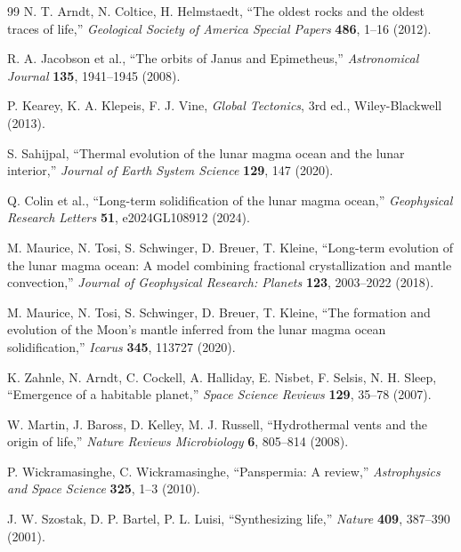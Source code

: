 \documentclass[11pt,a4paper]{article}
\begin{document}
\begin{thebibliography}{99}
		N. T. Arndt, N. Coltice, H. Helmstaedt, ``The oldest rocks and the oldest traces of life,''
		\emph{Geological Society of America Special Papers} \textbf{486}, 1–16 (2012).
		
		R. A. Jacobson et al., ``The orbits of Janus and Epimetheus,''
		\emph{Astronomical Journal} \textbf{135}, 1941–1945 (2008).
		
		P. Kearey, K. A. Klepeis, F. J. Vine, \emph{Global Tectonics}, 3rd ed., Wiley-Blackwell (2013).
		
		S. Sahijpal, ``Thermal evolution of the lunar magma ocean and the lunar interior,''
		\emph{Journal of Earth System Science} \textbf{129}, 147 (2020).
		
		Q. Colin et al., ``Long-term solidification of the lunar magma ocean,''
		\emph{Geophysical Research Letters} \textbf{51}, e2024GL108912 (2024).
		
		M. Maurice, N. Tosi, S. Schwinger, D. Breuer, T. Kleine, ``Long-term evolution of the lunar magma ocean: A model combining fractional crystallization and mantle convection,''
		\emph{Journal of Geophysical Research: Planets} \textbf{123}, 2003–2022 (2018).
		
		M. Maurice, N. Tosi, S. Schwinger, D. Breuer, T. Kleine, ``The formation and evolution of the Moon's mantle inferred from the lunar magma ocean solidification,''
		\emph{Icarus} \textbf{345}, 113727 (2020).
		
		K. Zahnle, N. Arndt, C. Cockell, A. Halliday, E. Nisbet, F. Selsis, N. H. Sleep, ``Emergence of a habitable planet,''
		\emph{Space Science Reviews} \textbf{129}, 35–78 (2007).
		
		W. Martin, J. Baross, D. Kelley, M. J. Russell, ``Hydrothermal vents and the origin of life,''
		\emph{Nature Reviews Microbiology} \textbf{6}, 805–814 (2008).
		
		P. Wickramasinghe, C. Wickramasinghe, ``Panspermia: A review,''
		\emph{Astrophysics and Space Science} \textbf{325}, 1–3 (2010).
		
		J. W. Szostak, D. P. Bartel, P. L. Luisi, ``Synthesizing life,''
		\emph{Nature} \textbf{409}, 387–390 (2001).
		
	\end{thebibliography}
	
\end{document}
